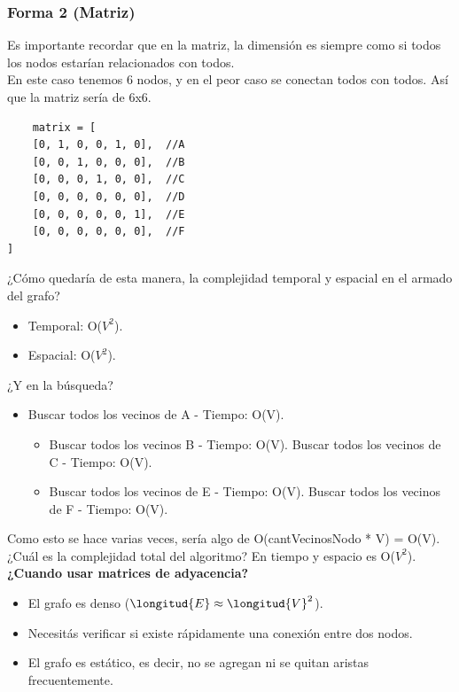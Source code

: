 \documentclass[10pt,a4paper]{article}
\begin{document}
\subsubsection*{Forma 2 (Matriz)}
Es importante recordar que en la matriz, la dimensión es siempre como si todos los nodos estarían relacionados con todos. \\
En este caso tenemos 6 nodos, y en el peor caso se conectan todos con todos. Así que la matriz sería de 6x6. \\
\begin{lstlisting}
    matrix = [
    [0, 1, 0, 0, 1, 0],  //A
    [0, 0, 1, 0, 0, 0],  //B
    [0, 0, 0, 1, 0, 0],  //C
    [0, 0, 0, 0, 0, 0],  //D
    [0, 0, 0, 0, 0, 1],  //E 
    [0, 0, 0, 0, 0, 0],  //F 
]
\end{lstlisting}
¿Cómo quedaría de esta manera, la complejidad temporal y espacial en el armado del grafo? 
\begin{itemize}
    \item Temporal: O($V^{2}$).
    \item Espacial: O($V^{2}$).
\end{itemize}
¿Y en la búsqueda? 
\begin{itemize}
    \item Buscar todos los vecinos de A - Tiempo: O(V).
    \begin{itemize}
        \item Buscar todos los vecinos B - Tiempo: O(V). Buscar todos los vecinos de C - Tiempo: O(V). 
        \item Buscar todos los vecinos de E - Tiempo: O(V). Buscar todos los vecinos de F - Tiempo: O(V).
    \end{itemize}
\end{itemize}
Como esto se hace varias veces, sería algo de O(cantVecinosNodo * V) = O(V). \\
¿Cuál es la complejidad total del algoritmo? En tiempo y espacio es O($V^{2}$). \\
\textbf{¿Cuando usar matrices de adyacencia?}
\begin{itemize}
    \item El grafo es denso ($\longitud{E} \approx \longitud{V}^{2}$).
    \item Necesitás verificar si existe rápidamente una conexión entre dos nodos.
    \item El grafo es estático, es decir, no se agregan ni se quitan aristas frecuentemente.
\end{itemize}
\end{document}
